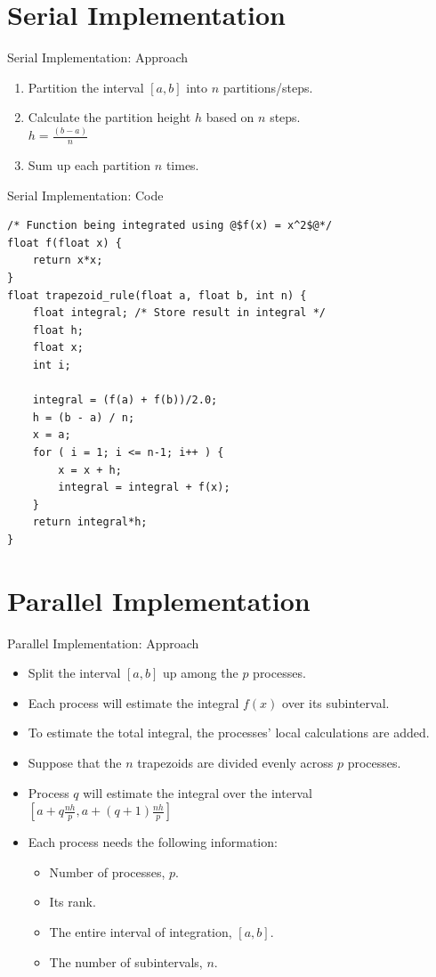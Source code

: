 \documentclass[t]{beamer}
\begin{document}
\section{Serial Implementation}
\begin{frame}{Serial Implementation: Approach}
	\begin{enumerate}
		\item Partition the interval $[a,b]$ into $n$ partitions/steps.
		\item Calculate the partition height $h$ based on $n$ steps. \\
			$h = \frac{(b-a)}{n}$
		\item Sum up each partition $n$ times.
	\end{enumerate}
\end{frame}

\begin{frame}[containsverbatim]{Serial Implementation: Code}
\begin{verbatim}
/* Function being integrated using @$f(x) = x^2$@*/
float f(float x) {
	return x*x;
}
float trapezoid_rule(float a, float b, int n) {
	float integral; /* Store result in integral */
	float h;
	float x;
	int i;

	integral = (f(a) + f(b))/2.0;
	h = (b - a) / n;
	x = a;
	for ( i = 1; i <= n-1; i++ ) {
		x = x + h;
		integral = integral + f(x);
	}
	return integral*h;
}
\end{verbatim}
\end{frame}

\section{Parallel Implementation}
\begin{frame}{Parallel Implementation: Approach}
	\begin{itemize}
		\item Split the interval $[a,b]$ up among the $p$ processes.
		\item Each process will estimate the integral $f(x)$ over its subinterval.
		\item To estimate the total integral, the processes’ local calculations are added.
		\item Suppose that the $n$ trapezoids are divided evenly across $p$ processes.
		\item Process $q$ will estimate the integral over the interval \\
		$[a + q\frac{nh}{p}, a + (q + 1)\frac{nh}{p}]$
		
		\item Each process needs the following information:
		\begin{itemize}
			\item Number of processes, $p$.
			\item Its rank.
			\item The entire interval of integration, $[a, b]$.
			\item The number of subintervals, $n$.
		\end{itemize}
	\end{itemize}
\end{frame}
\end{document}
